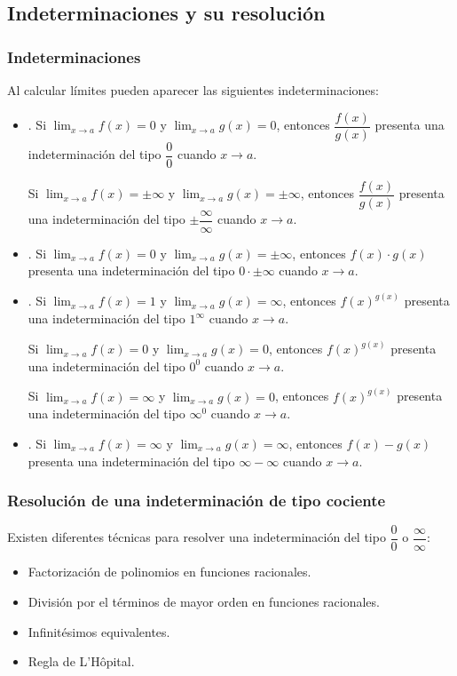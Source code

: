 \subsection{Indeterminaciones y su resolución}
\begin{frame}
\frametitle{Indeterminaciones}
Al calcular límites pueden aparecer las siguientes indeterminaciones:
\begin{itemize}
\item {}. Si $\lim_{x\rightarrow a} f(x)=0$ y $\lim_{x\rightarrow a} g(x)=0$, entonces
$\dfrac{f(x)}{g(x)}$ presenta una indeterminación del tipo \alert{$\dfrac{0}{0}$} cuando $x\rightarrow a$.

Si $\lim_{x\rightarrow a} f(x)=\pm\infty$ y $\lim_{x\rightarrow a} g(x)=\pm\infty$, entonces $\dfrac{f(x)}{g(x)}$ presenta una indeterminación del tipo \alert{$\pm\dfrac{\infty}{\infty}$} cuando $x\rightarrow a$.

\item {}. Si $\lim_{x\rightarrow a} f(x)=0$ y $\lim_{x\rightarrow a} g(x)=\pm\infty$,
 entonces $f(x)\cdot g(x)$ presenta una indeterminación del tipo \alert{$0\cdot \pm\infty$} cuando $x\rightarrow a$.

\item {}. Si $\lim_{x\rightarrow a} f(x)=1$ y $\lim_{x\rightarrow a} g(x)=\infty$,
entonces $f(x)^{g(x)}$ presenta una indeterminación del tipo \alert{$1^\infty$} cuando $x\rightarrow a$.

Si $\lim_{x\rightarrow a} f(x)=0$ y $\lim_{x\rightarrow a} g(x)=0$, entonces $f(x)^{g(x)}$ presenta una indeterminación del tipo \alert{$0^0$} cuando $x\rightarrow a$.

Si $\lim_{x\rightarrow a} f(x)=\infty$ y $\lim_{x\rightarrow a} g(x)=0$, entonces $f(x)^{g(x)}$ presenta una indeterminación del tipo \alert{$\infty^0$} cuando $x\rightarrow a$.

\item {}. Si $\lim_{x\rightarrow a} f(x)=\infty$ y $\lim_{x\rightarrow a}
 g(x)=\infty$, entonces $f(x)-g(x)$ presenta una indeterminación del tipo \alert{$\infty-\infty$} cuando $x\rightarrow a$.
\end{itemize}
\end{frame}


\begin{frame}
\frametitle{Resolución de una indeterminación de tipo cociente}
Existen diferentes técnicas para resolver una indeterminación del tipo $\dfrac{0}{0}$ o $\dfrac{\infty}{\infty}$:
\begin{itemize}
\item Factorización de polinomios en funciones racionales.
\item División por el términos de mayor orden en funciones racionales.
\item Infinitésimos equivalentes.
\item Regla de L'Hôpital.
\end{itemize}
\end{frame}


